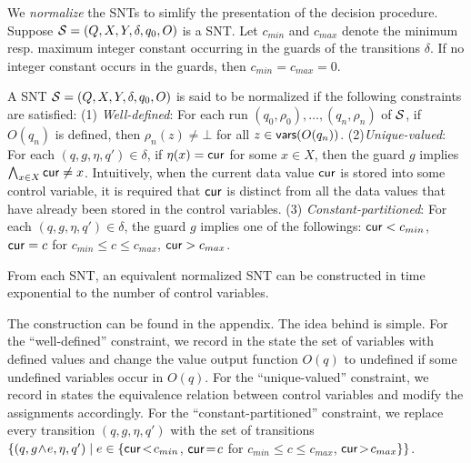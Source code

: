 We \emph{normalize} the SNTs to simlify the presentation of the decision procedure.
Suppose ${\mathcal{S} }=(Q,X,Y,\delta,q_0,O)$ is a SNT. Let $c_{min}$ and $c_{max}$ denote the minimum resp. maximum integer constant occurring in the guards of the transitions $\delta$. If no integer constant occurs in the guards, then $c_{min}=c_{max}=0$.

A SNT ${\mathcal{S} }=(Q,X,Y,\delta,q_0,O)$ is said to be normalized if the following constraints are satisfied:
(1) \emph{Well-defined}: For each run $(q_0,\rho_0),\dots,(q_n,\rho_n)$ of ${\mathcal{S} }$, if $O(q_n)$ is defined, then $\rho_n(z)\neq\bot$ for all  $z\in \mathsf{vars}(O(q_n))$. (2)\emph{Unique-valued}: For each $(q,g,\eta,q') \in \delta$, if $\eta(x)=\mathsf{cur}$ for some $x \in X$, then the guard $g$ implies $\bigwedge_{x \in X} \mathsf{cur} \neq x$.  Intuitively, when the current data value $\mathsf{cur}$ is stored into some control variable, it is required that $\mathsf{cur}$ is distinct from all the data values that have already been stored in the control variables. (3) \emph{Constant-partitioned}: For each $(q, g, \eta, q') \in \delta$, the guard $g$ implies one of the followings: $\mathsf{cur} < c_{min}$, $\mathsf{cur} = c$ for $c_{min} \le c \le c_{max}$, $\mathsf{cur} > c_{max}$. 
\begin{proposition}\label{prop-snt-norm}
	From each SNT, an equivalent normalized SNT can be constructed in time exponential to the number of control variables. 
\end{proposition}
The construction can be found in the appendix. The idea behind is simple. For the ``well-defined'' constraint, we record in the state the set of variables with defined values and change the value output function $O(q)$ to undefined if some undefined variables occur in $O(q)$. For the ``unique-valued'' constraint, we record in states the equivalence relation between control variables and modify the assignments accordingly. For the ``constant-partitioned'' constraint, we replace every transition $(q, g, \eta, q')$ with the set of transitions 
$\{(q, g\!\wedge\! e, \eta, q') \mid e\in\{\mathsf{cur}\!<\!c_{min}$, $\mathsf{cur}\!=\!c$ for $c_{min}\!\le\!c\!\le\!c_{max}$, $\mathsf{cur}\! >\! c_{max}\}\}$.